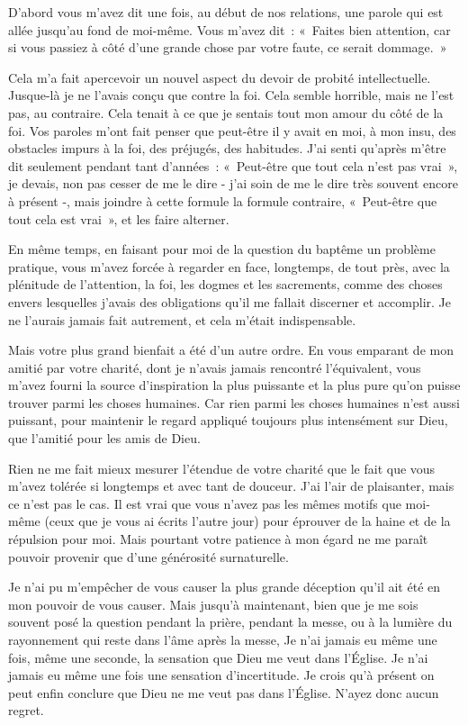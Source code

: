 \documentclass[french,twoside]{book} %
\begin{document}
D'abord vous m'avez dit une fois, au début de nos relations, une parole qui est allée jusqu'au fond de moi-même. Vous m'avez dit : « Faites bien attention, car si vous passiez à côté d'une grande chose par votre faute, ce serait dommage. »\par
Cela m'a fait apercevoir un nouvel aspect du devoir de probité intellectuelle. Jusque-là je ne l'avais conçu que contre la foi. Cela semble horrible, mais ne l'est pas, au contraire. Cela tenait à ce que je sentais tout mon amour du côté de la foi. Vos paroles m'ont fait penser que peut-être il y avait en moi, à mon insu, des obstacles impurs à la foi, des préjugés, des habitudes. J'ai senti qu'après m'être dit seulement pendant tant d'années : « Peut-être que tout cela n'est pas vrai », je devais, non pas cesser de me le dire - j'ai soin de me le dire très souvent encore à présent -, mais joindre à cette formule la formule contraire, « Peut-être que tout cela est vrai », et les faire alterner.\par
En même temps, en faisant pour moi de la question du baptême un problème pratique, vous m'avez forcée à regarder en face, longtemps, de tout près, avec la plénitude de l'attention, la foi, les dogmes et les sacrements, comme des choses envers lesquelles j'avais des obligations qu'il me fallait discerner et accomplir. Je ne l'aurais jamais fait autrement, et cela m'était indispensable.\par
Mais votre plus grand bienfait a été d'un autre ordre. En vous emparant de mon amitié par votre charité, dont je n'avais jamais rencontré l'équivalent, vous m'avez fourni la source d'inspiration la plus puissante et la plus pure qu'on puisse trouver parmi les choses humaines. Car rien parmi les choses humaines n'est aussi puissant, pour maintenir le regard appliqué toujours plus intensément sur Dieu, que l'amitié pour les amis de Dieu.\par
Rien ne me fait mieux mesurer l'étendue de votre charité que le fait que vous m'avez tolérée si longtemps et avec tant de douceur. J'ai l'air de plaisanter, mais ce n'est pas le cas. Il est vrai que vous n'avez pas les mêmes motifs que moi-même (ceux que je vous ai écrits l'autre jour) pour éprouver de la haine et de la répulsion pour moi. Mais pourtant votre patience à mon égard ne me paraît pouvoir provenir que d'une générosité surnaturelle.\par
Je n'ai pu m'empêcher de vous causer la plus grande déception qu'il ait été en mon pouvoir de vous causer. Mais jusqu'à maintenant, bien que je me sois souvent posé la question pendant la prière, pendant la messe, ou à la lumière du rayonnement qui reste dans l'âme après la messe, Je n'ai jamais eu même une fois, même une seconde, la sensation que Dieu me veut dans l'Église. Je n'ai jamais eu même une fois une sensation d'incertitude. Je crois qu'à présent on peut enfin conclure que Dieu ne me veut pas dans l'Église. N'ayez donc aucun regret.\par
\end{document}
